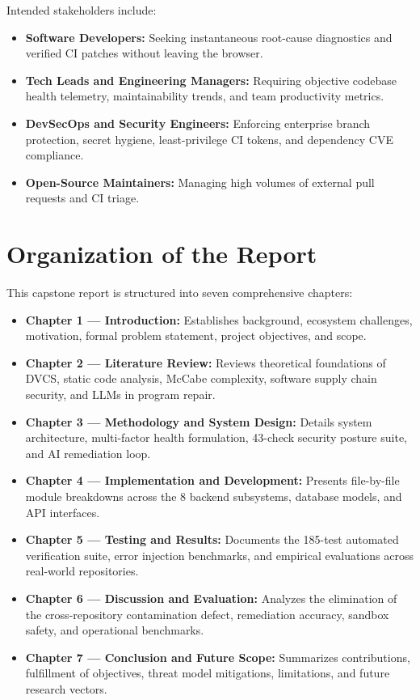 Intended stakeholders include:
\begin{itemize}
    \item \textbf{Software Developers:} Seeking instantaneous root-cause diagnostics and verified CI patches without leaving the browser.
    \item \textbf{Tech Leads and Engineering Managers:} Requiring objective codebase health telemetry, maintainability trends, and team productivity metrics.
    \item \textbf{DevSecOps and Security Engineers:} Enforcing enterprise branch protection, secret hygiene, least-privilege CI tokens, and dependency CVE compliance.
    \item \textbf{Open-Source Maintainers:} Managing high volumes of external pull requests and CI triage.
\end{itemize}

\section{Organization of the Report}
\label{sec:organization}

This capstone report is structured into seven comprehensive chapters:
\begin{itemize}
    \item \textbf{Chapter 1 --- Introduction:} Establishes background, ecosystem challenges, motivation, formal problem statement, project objectives, and scope.
    \item \textbf{Chapter 2 --- Literature Review:} Reviews theoretical foundations of DVCS, static code analysis, McCabe complexity, software supply chain security, and LLMs in program repair.
    \item \textbf{Chapter 3 --- Methodology and System Design:} Details system architecture, multi-factor health formulation, 43-check security posture suite, and AI remediation loop.
    \item \textbf{Chapter 4 --- Implementation and Development:} Presents file-by-file module breakdowns across the 8 backend subsystems, database models, and API interfaces.
    \item \textbf{Chapter 5 --- Testing and Results:} Documents the 185-test automated verification suite, error injection benchmarks, and empirical evaluations across real-world repositories.
    \item \textbf{Chapter 6 --- Discussion and Evaluation:} Analyzes the elimination of the cross-repository contamination defect, remediation accuracy, sandbox safety, and operational benchmarks.
    \item \textbf{Chapter 7 --- Conclusion and Future Scope:} Summarizes contributions, fulfillment of objectives, threat model mitigations, limitations, and future research vectors.
\end{itemize}


